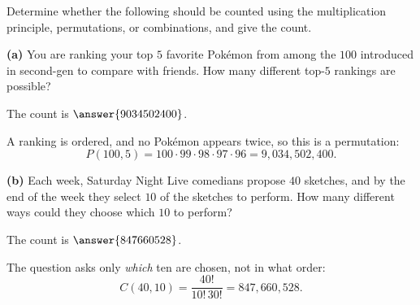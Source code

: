 \documentclass[12pt]{ximera}
\begin{document}
\begin{problem}
Determine whether the following should be counted using the multiplication principle,
permutations, or combinations, and give the count.

\begin{prompt}
\textbf{(a)} You are ranking your top $5$ favorite Pok\'emon from among the $100$
introduced in second-gen to compare with friends. How many different top-$5$ rankings
are possible?

\begin{multipleChoice}
\end{multipleChoice}

The count is $\answer{9034502400}$.

\begin{solution}
A ranking is ordered, and no Pok\'emon appears twice, so this is a permutation:
\[
P(100,5)=100\cdot 99\cdot 98\cdot 97\cdot 96 = 9{,}034{,}502{,}400.
\]
\end{solution}
\end{prompt}

\begin{prompt}
\textbf{(b)} Each week, Saturday Night Live comedians propose $40$ sketches, and by
the end of the week they select $10$ of the sketches to perform. How many different
ways could they choose which $10$ to perform?

\begin{multipleChoice}
\end{multipleChoice}

The count is $\answer{847660528}$.

\begin{solution}
The question asks only \emph{which} ten are chosen, not in what order:
\[
C(40,10)=\frac{40!}{10!\,30!}=847{,}660{,}528.
\]
\end{solution}
\end{prompt}
\end{problem}
\end{document}
